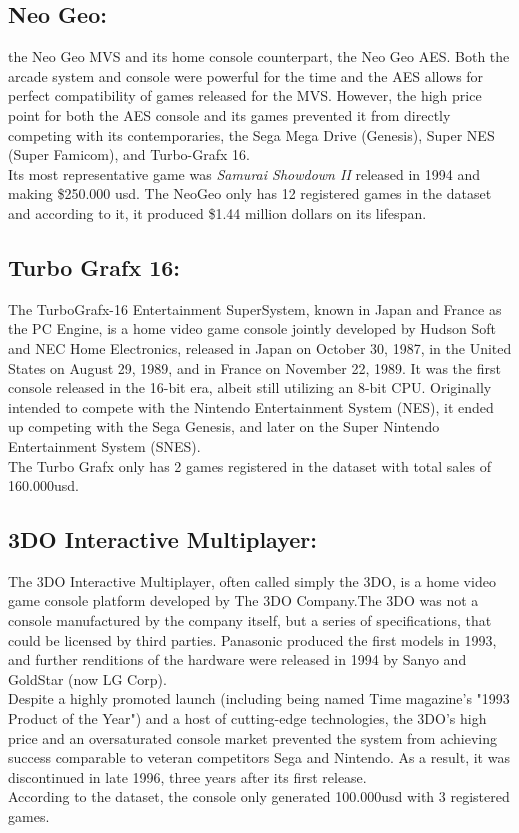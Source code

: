 \subsection{Neo Geo:}
 the Neo Geo MVS and its home console counterpart, the Neo Geo AES. Both the
 arcade system and console were powerful for the time and the AES allows for
 perfect compatibility of games released for the MVS. However, the high price
 point for both the AES console and its games prevented it from directly
 competing with its contemporaries, the Sega Mega Drive (Genesis), Super NES
 (Super Famicom), and Turbo-Grafx 16\cite{NeoGeo}.\\
 Its most representative game was \textit{Samurai Showdown II} released in
 1994 and making \$250.000 usd. The NeoGeo only has 12 registered games in the
 dataset and according to it, it produced \$1.44 million dollars on its
 lifespan.

 \subsection{Turbo Grafx 16:}
 The TurboGrafx-16 Entertainment SuperSystem, known in Japan and France as
 the PC Engine, is a home video game console jointly developed by Hudson Soft
 and NEC Home Electronics, released in Japan on October 30, 1987, in the
 United States on August 29, 1989, and in France on November 22, 1989. It was
 the first console released in the 16-bit era, albeit still utilizing an
 8-bit CPU. Originally intended to compete with the Nintendo Entertainment
 System (NES), it ended up competing with the Sega Genesis, and later on the
 Super Nintendo Entertainment System (SNES)\cite{TurboGrafx}.\\
 The Turbo Grafx only has 2 games registered in the dataset with total sales
 of 160.000usd.
 \subsection{3DO Interactive Multiplayer:}
 The 3DO Interactive Multiplayer, often called simply the 3DO, is a home
 video game console platform developed by The 3DO Company.The 3DO was not a
 console manufactured by the company itself, but a series of specifications,
 that could be licensed by third parties. Panasonic produced the first
 models in 1993, and further renditions of the hardware were released in 1994
 by Sanyo and GoldStar (now LG Corp).\\
 Despite a highly promoted launch (including being named Time magazine's
 "1993 Product of the Year") and a host of cutting-edge technologies, the
 3DO's high price and an oversaturated console market prevented the system
 from achieving success comparable to veteran competitors Sega and
 Nintendo. As a result, it was discontinued in late 1996, three years after
 its first release\cite{Panasonic3DO}.\\
 According to the dataset, the console only generated 100.000usd with 3
 registered games.

